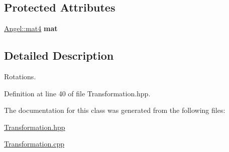 \subsection*{Protected Attributes}
\begin{DoxyCompactItemize}
\item 
\hypertarget{class_transformation_a5f39fb578a1cdf78ca85efbd932d3834}{\hyperlink{class_angel_1_1mat4}{Angel\-::mat4} {\bfseries mat}}\label{class_transformation_a5f39fb578a1cdf78ca85efbd932d3834}

\end{DoxyCompactItemize}


\subsection{Detailed Description}
Rotations. 

Definition at line 40 of file Transformation.\-hpp.



The documentation for this class was generated from the following files\-:\begin{DoxyCompactItemize}
\item 
\hyperlink{_transformation_8hpp}{Transformation.\-hpp}\item 
\hyperlink{_transformation_8cpp}{Transformation.\-cpp}\end{DoxyCompactItemize}
